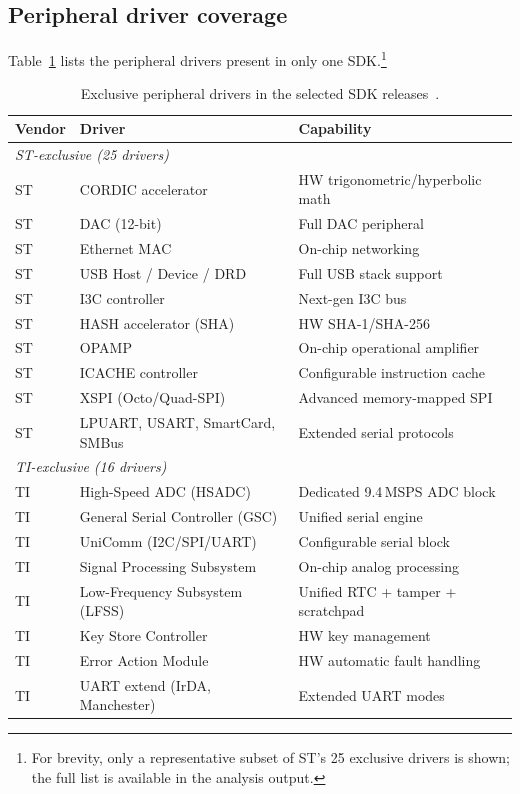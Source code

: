 \subsection{Peripheral driver coverage}
\label{subsec:ti-periph-gaps}

Table~\ref{tab:ti-periph-exclusive} lists the peripheral drivers present in only one
SDK.\footnote{For brevity, only a representative subset of ST's 25 exclusive drivers is
shown; the full list is available in the analysis output.}

\begin{table}[H]
\centering
\caption{Exclusive peripheral drivers in the selected SDK releases~\cite{stm32cubec5-sw,ti-mspm33-sdk}.}
\label{tab:ti-periph-exclusive}
\begin{tabular}{l p{5.5cm} l}
\toprule
\textbf{Vendor} & \textbf{Driver} & \textbf{Capability} \\
\midrule
\multicolumn{3}{l}{\textit{ST-exclusive (25 drivers)}} \\
ST & CORDIC accelerator              & HW trigonometric/hyperbolic math \\
ST & DAC (12-bit)                    & Full DAC peripheral \\
ST & Ethernet MAC                    & On-chip networking \\
ST & USB Host / Device / DRD         & Full USB stack support \\
ST & I3C controller                  & Next-gen I3C bus \\
ST & HASH accelerator (SHA)          & HW SHA-1/SHA-256 \\
ST & OPAMP                           & On-chip operational amplifier \\
ST & ICACHE controller               & Configurable instruction cache \\
ST & XSPI (Octo/Quad-SPI)           & Advanced memory-mapped SPI \\
ST & LPUART, USART, SmartCard, SMBus & Extended serial protocols \\
\midrule
\multicolumn{3}{l}{\textit{TI-exclusive (16 drivers)}} \\
TI & High-Speed ADC (HSADC)          & Dedicated 9.4\,MSPS ADC block \\
TI & General Serial Controller (GSC) & Unified serial engine \\
TI & UniComm (I2C/SPI/UART)          & Configurable serial block \\
TI & Signal Processing Subsystem     & On-chip analog processing \\
TI & Low-Frequency Subsystem (LFSS)  & Unified RTC + tamper + scratchpad \\
TI & Key Store Controller            & HW key management \\
TI & Error Action Module             & HW automatic fault handling \\
TI & UART extend (IrDA, Manchester)  & Extended UART modes \\
\bottomrule
\end{tabular}
\end{table}

